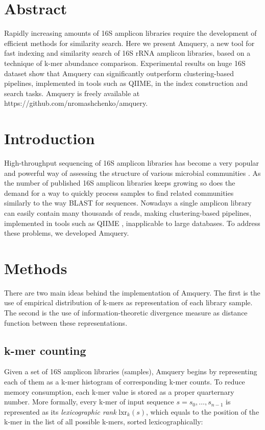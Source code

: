 \documentclass[10pt,letterpaper]{article}
\begin{document}
\section*{Abstract}
Rapidly increasing amounts of 16S amplicon libraries require the development of efficient methods for similarity search. 
Here we present Amquery, a new tool for fast indexing and similarity search of 16S rRNA amplicon libraries, based on a technique of k-mer abundance comparison.
Experimental results on huge 16S dataset show that Amquery can significantly outperform clustering-based pipelines, implemented in tools such as QIIME, in the index construction and search tasks. 
Amquery is freely available at https://github.com/nromashchenko/amquery.

\linenumbers

\section*{Introduction}
High-throughput sequencing of 16S amplicon libraries has become a very popular and powerful way of assessing the structure of various microbial communities \cite{qin2010human, seedorf2014bacteria, ligi2014characterization}.
As the number of published 16S amplicon libraries keeps growing so does the demand for a way to quickly process samples to find related communities similarly to the way BLAST for sequences. Nowadays a single amplicon library can easily contain many thousands of reads, making clustering-based pipelines, implemented in tools such as QIIME \cite{caporaso2010qiime}, inapplicable to large databases. To address these problems, we developed Amquery.


\section*{Methods}
There are two main ideas behind the implementation of Amquery. The first is the use of empirical distribution of k-mers as representation of each library sample. The second is the use of information-theoretic divergence measure as distance function between these representations. 

\subsection*{k-mer counting}
Given a set of 16S amplicon libraries (samples), Amquery begins by representing each of them as a k-mer histogram of corresponding k-mer counts. To reduce memory consumption, each k-mer value is stored as a proper quarternary number.
More formally, every k-mer of input sequence $s = s_0,\dots,s_{n-1}$ is represented as its \textit{lexicographic rank} $\mathrm{lxr}_k(s)$, which equals to the position of the k-mer in the list of all possible k-mers, sorted lexicographically:
\end{document}
